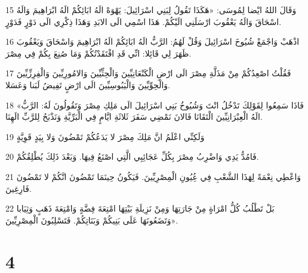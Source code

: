 \par 15 وَقَالَ اللهُ ايْضا لِمُوسَى: «هَكَذَا تَقُولُ لِبَنِي اسْرَائِيلَ: يَهْوَهْ الَهُ ابَائِكُمْ الَهُ ابْرَاهِيمَ وَالَهُ اسْحَاقَ وَالَهُ يَعْقُوبَ ارْسَلَنِي الَيْكُمْ. هَذَا اسْمِي الَى الابَدِ وَهَذَا ذِكْرِي الَى دَوْرٍ فَدَوْرٍ.
\par 16 اذْهَبْ وَاجْمَعْ شُيُوخَ اسْرَائِيلَ وَقُلْ لَهُمُ: الرَّبُّ الَهُ ابَائِكُمْ الَهُ ابْرَاهِيمَ وَاسْحَاقَ وَيَعْقُوبَ ظَهَرَ لِي قَائِلا: انِّي قَدِ افْتَقَدْتُكُمْ وَمَا صُنِعَ بِكُمْ فِي مِصْرَ.
\par 17 فَقُلْتُ اصْعِدُكُمْ مِنْ مَذَلَّةِ مِصْرَ الَى ارْضِ الْكَنْعَانِيِّينَ وَالْحِثِّيِّينَ وَالامُورِيِّينَ وَالْفِرِزِّيِّينَ وَالْحِوِّيِّينَ وَالْيَبُوسِيِّينَ الَى ارْضٍ تَفِيضُ لَبَنا وَعَسَلا.
\par 18 «فَاذَا سَمِعُوا لِقَوْلِكَ تَدْخُلُ انْتَ وَشُيُوخُ بَنِي اسْرَائِيلَ الَى مَلِكِ مِصْرَ وَتَقُولُونَ لَهُ: الرَّبُّ الَهُ الْعِبْرَانِيِّينَ الْتَقَانَا فَالانَ نَمْضِي سَفَرَ ثَلاثَةِ ايَّامٍ فِي الْبَرِّيَّةِ وَنَذْبَحُ لِلرَّبِّ الَهِنَا.
\par 19 وَلَكِنِّي اعْلَمُ انَّ مَلِكَ مِصْرَ لا يَدَعُكُمْ تَمْضُونَ وَلا بِيَدٍ قَوِيَّةٍ
\par 20 فَامُدُّ يَدِي وَاضْرِبُ مِصْرَ بِكُلِّ عَجَائِبِي الَّتِي اصْنَعُ فِيهَا. وَبَعْدَ ذَلِكَ يُطْلِقُكُمْ.
\par 21 وَاعْطِي نِعْمَةً لِهَذَا الشَّعْبِ فِي عُِيُونِ الْمِصْرِيِّينَ. فَيَكُونُ حِينَمَا تَمْضُونَ انَّكُمْ لا تَمْضُونَ فَارِغِينَ.
\par 22 بَلْ تَطْلُبُ كُلُّ امْرَاةٍ مِنْ جَارَتِهَا وَمِنْ نَزِيلَةِ بَيْتِهَا امْتِعَةَ فِضَّةٍ وَامْتِعَةَ ذَهَبٍ وَثِيَابا وَتَضَعُونَهَا عَلَى بَنِيكُمْ وَبَنَاتِكُمْ. فَتَسْلِبُونَ الْمِصْرِيِّينَ».

\chapter{4}

